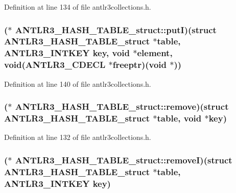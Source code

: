 Definition at line 134 of file antlr3collections.\-h.

\hypertarget{struct_a_n_t_l_r3___h_a_s_h___t_a_b_l_e__struct_a02775fc520b0fab70f981cb48fcf9cb0}{
\subsubsection[{put\-I}]{($\ast$ A\-N\-T\-L\-R3\-\_\-\-H\-A\-S\-H\-\_\-\-T\-A\-B\-L\-E\-\_\-struct\-::put\-I)(struct {\bf A\-N\-T\-L\-R3\-\_\-\-H\-A\-S\-H\-\_\-\-T\-A\-B\-L\-E\-\_\-struct} $\ast$table, {\bf A\-N\-T\-L\-R3\-\_\-\-I\-N\-T\-K\-E\-Y} key, void $\ast$element, void({\bf A\-N\-T\-L\-R3\-\_\-\-C\-D\-E\-C\-L} $\ast$freeptr)(void $\ast$))}}\label{struct_a_n_t_l_r3___h_a_s_h___t_a_b_l_e__struct_a02775fc520b0fab70f981cb48fcf9cb0}


Definition at line 140 of file antlr3collections.\-h.

\hypertarget{struct_a_n_t_l_r3___h_a_s_h___t_a_b_l_e__struct_a0cd3cdef0fdf565c7b3e52bbefc68777}{
\subsubsection[{remove}]{($\ast$ A\-N\-T\-L\-R3\-\_\-\-H\-A\-S\-H\-\_\-\-T\-A\-B\-L\-E\-\_\-struct\-::remove)(struct {\bf A\-N\-T\-L\-R3\-\_\-\-H\-A\-S\-H\-\_\-\-T\-A\-B\-L\-E\-\_\-struct} $\ast$table, void $\ast$key)}}\label{struct_a_n_t_l_r3___h_a_s_h___t_a_b_l_e__struct_a0cd3cdef0fdf565c7b3e52bbefc68777}


Definition at line 132 of file antlr3collections.\-h.

\hypertarget{struct_a_n_t_l_r3___h_a_s_h___t_a_b_l_e__struct_a72f8a4c1833aeb721321eab688a5feed}{
\subsubsection[{remove\-I}]{($\ast$ A\-N\-T\-L\-R3\-\_\-\-H\-A\-S\-H\-\_\-\-T\-A\-B\-L\-E\-\_\-struct\-::remove\-I)(struct {\bf A\-N\-T\-L\-R3\-\_\-\-H\-A\-S\-H\-\_\-\-T\-A\-B\-L\-E\-\_\-struct} $\ast$table, {\bf A\-N\-T\-L\-R3\-\_\-\-I\-N\-T\-K\-E\-Y} key)}}\label{struct_a_n_t_l_r3___h_a_s_h___t_a_b_l_e__struct_a72f8a4c1833aeb721321eab688a5feed}


